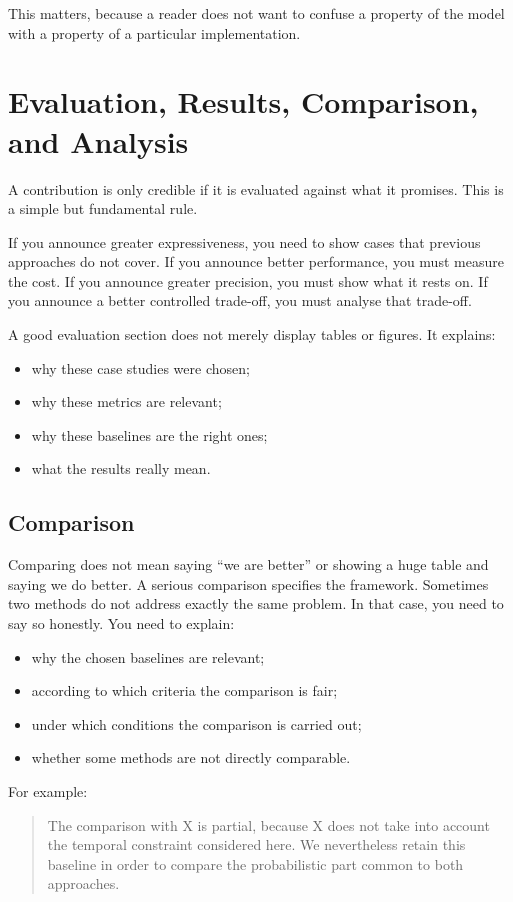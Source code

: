 \documentclass[11pt,a4paper]{article}
\theoremstyle{definition}
\begin{document}
This matters, because a reader does not want to confuse a property of the model with a property of a particular implementation.

\section{Evaluation, Results, Comparison, and Analysis}

A contribution is only credible if it is evaluated against what it promises. This is a simple but fundamental rule.

If you announce greater expressiveness, you need to show cases that previous approaches do not cover. If you announce better performance, you must measure the cost. If you announce greater precision, you must show what it rests on. If you announce a better controlled trade-off, you must analyse that trade-off.

A good evaluation section does not merely display tables or figures. It explains:
\begin{itemize}
    \item why these case studies were chosen;
    \item why these metrics are relevant;
    \item why these baselines are the right ones;
    \item what the results really mean.
\end{itemize}

\subsection*{Comparison}

Comparing does not mean saying ``we are better'' or showing a huge table and saying we do better. A serious comparison specifies the framework. Sometimes two methods do not address exactly the same problem. In that case, you need to say so honestly. You need to explain:
\begin{itemize}
    \item why the chosen baselines are relevant;
    \item according to which criteria the comparison is fair;
    \item under which conditions the comparison is carried out;
    \item whether some methods are not directly comparable.
\end{itemize}

For example:
\begin{quote}
The comparison with X is partial, because X does not take into account the temporal constraint considered here. We nevertheless retain this baseline in order to compare the probabilistic part common to both approaches.
\end{quote}
\end{document}
